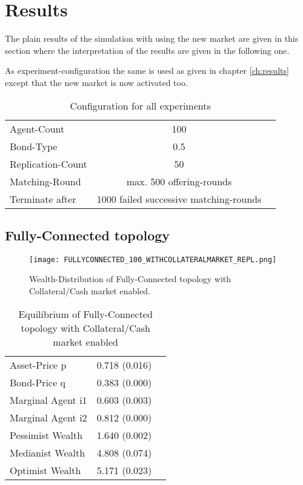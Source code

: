 \documentclass[Bachelorarbeit.tex]{subfiles}
\begin{document}
\section{Results}
The plain results of the simulation with using the new market are given in this section where the interpretation of the results are given in the following one.

\medskip

As experiment-configuration the same is used as given in chapter \ref{ch:results} except that the new market is now activated too.

\begin{table}[H]
	\centering
	\caption{Configuration for all experiments}
	\begin{tabular} { l c r }
		\hline
		Agent-Count & 100 \\
		Bond-Type & 0.5 \\
		Replication-Count & 50 \\
		Matching-Round & max. 500 offering-rounds \\
		Terminate after & 1000 failed successive matching-rounds \\
		\hline
	\end{tabular}
\end{table}

\subsection{Fully-Connected topology}

\begin{figure}[H]
	\centering
  \texttt{[image: FULLYCONNECTED\_100\_WITHCOLLATERALMARKET\_REPL.png]}
	\caption{Wealth-Distribution of Fully-Connected topology with Collateral/Cash market enabled.}
	\label{fig:wealth_FULLYCONNECTED_100_WITHCOLLATERALMARKET_REPL}
\end{figure}

\begin{table}[H]
	\caption{Equilibrium of Fully-Connected topology with Collateral/Cash market enabled}
	\label{tab:equilibrium_FULLY_CONNECTED_WITH_COLLATERALCASH}
	\centering
	\begin{tabular} { l c r }
		\hline
		Asset-Price p & 0.718 (0.016) \\
		Bond-Price q & 0.383 (0.000) \\
		Marginal Agent i1 & 0.603 (0.003) \\
		Marginal Agent i2 & 0.812 (0.000) \\
		\hline
		Pessimist Wealth & 1.640 (0.002) \\
		Medianist Wealth & 4.808 (0.074) \\
		Optimist Wealth & 5.171 (0.023) \\
		\hline
	\end{tabular}
\end{table} 
\end{document}
